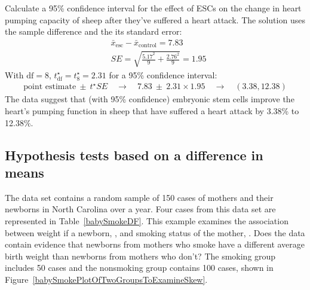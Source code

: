 \begin{example}{Calculate a 95\% confidence interval for the effect of ESCs on the change in heart pumping capacity of sheep after they've suffered a heart attack.}
The solution uses the sample difference and the its standard error:\textC{\vspace{-3mm}}
\begin{align*}
& \bar{x}_{\text{esc}} - \bar{x}_{\text{control}} = 7.83 \\
& SE = \sqrt{\frac{5.17^2}{9} + \frac{2.76^2}{9}} = 1.95
\end{align*}
With $\text{df} = 8$,  $t^{\star}_{\text{df}} = t^{\star}_{8} = 2.31$ for a 95\% confidence interval:\textC{\vspace{-1mm}}
\begin{align*}
\text{point estimate} \ \pm\ t^{\star}SE \quad\rightarrow\quad
7.83 \ \pm\ 2.31\times 1.95 \quad\rightarrow\quad (3.38, 12.38)
\end{align*}
The data suggest that (with 95\% confidence) embryonic stem cells improve the heart's pumping function in sheep that have suffered a heart attack by 3.38\% to 12.38\%.
\end{example}



\subsection{Hypothesis tests based on a difference in means}


The data set  contains a random sample of 150 cases of mothers and their newborns in North Carolina over a year. Four cases from this data set are represented in Table~\ref{babySmokeDF}. This example examines the association between weight if a newborn, , and smoking status of the mother, .  Does the data contain  evidence that newborns from mothers who smoke have a different average birth weight than newborns from mothers who don't?  The smoking group includes 50 cases and the nonsmoking group contains 100 cases, shown in Figure~\ref{babySmokePlotOfTwoGroupsToExamineSkew}.

